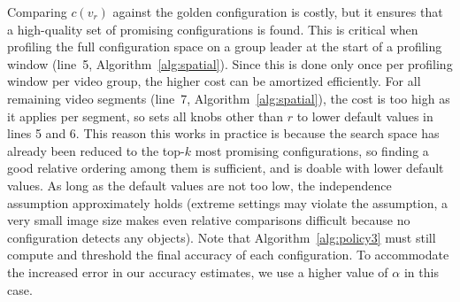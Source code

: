 
Comparing $c(v_r)$ against the golden configuration is costly, but it
ensures that a high-quality set of promising configurations is found. This is critical
when profiling the full configuration space on a group leader at the start of a profiling window (line~5, Algorithm~\ref{alg:spatial}).
Since this is done only once per profiling window per video group, the higher cost can be amortized efficiently. For all remaining video segments (line~7, Algorithm~\ref{alg:spatial}), the cost is  too high as it applies per segment, so \name sets all knobs other than $r$ to lower default values in lines 5 and 6. 
This reason this works in practice is because the search space has already been reduced to the top-$k$ most promising configurations, so finding a good relative ordering among them is sufficient, and is doable with lower
default values. As long as the default values are not
too low, the independence assumption approximately holds (extreme settings may violate the assumption,
\eg a very small image size makes even relative comparisons difficult because no configuration detects any objects).
Note that Algorithm~\ref{alg:policy3} must still compute and threshold the final accuracy of each configuration. To accommodate the increased error in our accuracy estimates, we use a higher value of $\alpha$ in this case.


